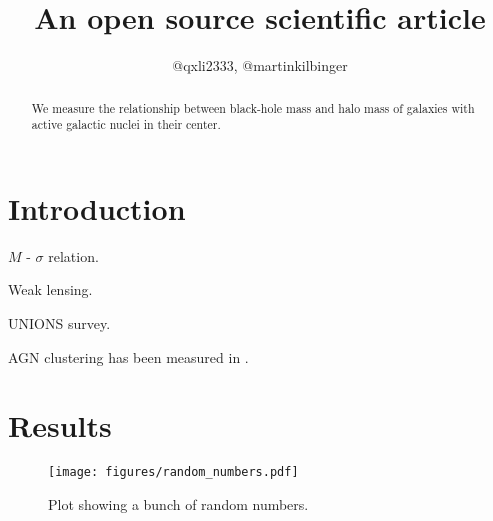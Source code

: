 \documentclass[twocolumn]{aastex631}
\begin{document}
\title{An open source scientific article}

\author{@qxli2333, @martinkilbinger}

\begin{abstract}
  We measure the relationship between black-hole mass and halo mass
  of galaxies with active galactic nuclei in their center.
\end{abstract}

\section{Introduction}
\label{sec:intro}

$M$ - $\sigma$ relation.

Weak lensing.

UNIONS survey.

AGN clustering has been measured in \citet{2018ApJ...858..110P}.

\section{Results}

\begin{figure}[ht!]
    \begin{centering}
        \texttt{[image: figures/random\_numbers.pdf]}
        \caption{
            Plot showing a bunch of random numbers.
        }
        \label{fig:random_numbers}
    \end{centering}
\end{figure}


\end{document}
